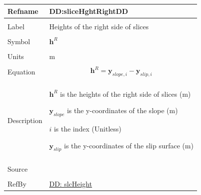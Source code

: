 \documentclass[12pt]{article}
\begin{document}
\noindent \begin{minipage}{\textwidth}
          \begin{tabular}{>{\raggedright}p{}>{\raggedright\arraybackslash}p{}}
          \toprule \textbf{Refname} & \textbf{DD:sliceHghtRightDD}
          \label{DD:sliceHghtRightDD}
          \\ \midrule \\
          Label & Heights of the right side of slices
          \\ \midrule \\
          Symbol & ${\mathbf{h}^{R}}$
          \\ \midrule \\
          Units & m
          \\ \midrule \\
          Equation & \begin{displaymath}
                     {\mathbf{h}^{R}}={\mathbf{y}_{slope,i}}-{\mathbf{y}_{slip,i}}
                     \end{displaymath}
          \\ \midrule \\
          Description & \begin{symbDescription}
                        \item{${\mathbf{h}^{R}}$ is the heights of the right side of slices (m)}
                        \item{${\mathbf{y}_{slope}}$ is the y-coordinates of the slope (m)}
                        \item{$i$ is the index (Unitless)}
                        \item{${\mathbf{y}_{slip}}$ is the y-coordinates of the slip surface (m)}
                        \end{symbDescription}
          \\ \midrule \\
          Source & \cite{fredlund1977}
          \\ \midrule \\
          RefBy & \hyperref[DD:slcHeight]{DD: slcHeight}
          \\ \bottomrule
          \end{tabular}
          \end{minipage}
\par~
\end{document}
